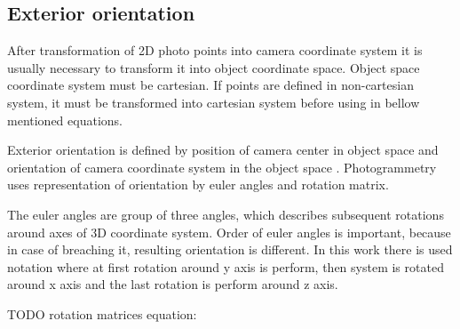 \documentclass[a4paper,12pt]{report}
\begin{document}
\subsection{Exterior orientation}

After transformation of 2D photo points into camera coordinate system it is usually necessary to transform it into object coordinate space.
Object space coordinate system must be cartesian. If points are defined in non-cartesian system, it must be transformed into cartesian 
system before using in bellow mentioned equations.

Exterior orientation is defined by position of camera center in object space and orientation of camera coordinate system in the object space .
Photogrammetry uses representation of orientation by euler angles and rotation matrix.

The euler angles are group of three angles, which describes subsequent rotations
 around axes of 3D coordinate system. 
 Order of euler angles is important, because in case of breaching it, resulting orientation is different. 
 In this work there is used notation where at first rotation around y axis is 
 perform, then system is rotated around x axis and the last rotation is perform around z axis.
 
 TODO rotation matrices equation:
 
\end{document}
